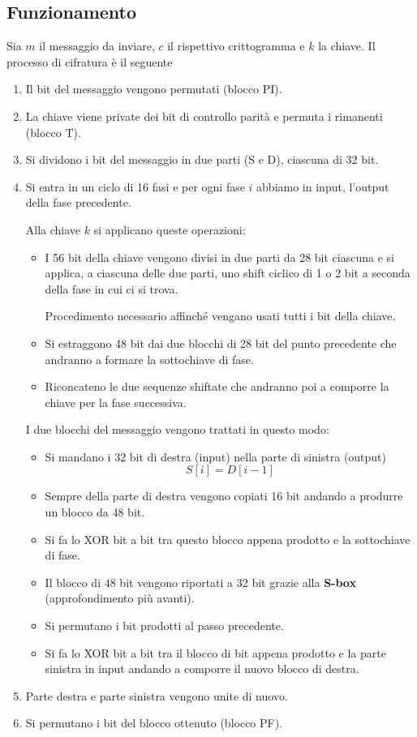 \subsection{Funzionamento}\label{funzionamento_DES}
Sia $m$ il messaggio da inviare, $c$ il rispettivo crittogramma e $k$ la chiave. Il processo di cifratura \`e il seguente
\begin{enumerate}
	\item Il bit del messaggio vengono permutati (blocco PI).
	\item La chiave viene private dei bit di controllo parit\`a e permuta i rimanenti (blocco T).
	\item Si dividono i bit del messaggio in due parti (S e D), ciascuna di 32 bit.
	\item Si entra in un ciclo di 16 fasi e per ogni fase $i$ abbiamo in input, l'output della fase precedente.

	      Alla chiave $k$ si applicano queste operazioni:
	      \begin{itemize}
		      \item I 56 bit della chiave vengono divisi in due parti da 28 bit ciascuna e si applica, a ciascuna delle
		            due parti, uno shift ciclico di 1 o 2 bit a seconda della fase in cui ci si trova.

		            Procedimento necessario affinch\'e vengano usati tutti i bit della chiave.
		      \item Si estraggono 48 bit dai due blocchi di 28 bit del punto precedente che andranno a formare la
		            sottochiave di fase.
		      \item Riconcateno le due sequenze shiftate che andranno poi a comporre la chiave per la fase successiva.
	      \end{itemize}
	      I due blocchi del messaggio vengono trattati in questo modo:
	      \begin{itemize}
		      \item Si mandano i 32 bit di destra (input) nella parte di sinistra (output)
		            \[ S[i] = D[i-1] \]
		      \item Sempre della parte di destra vengono copiati 16 bit andando a produrre un blocco da 48 bit.
		      \item Si fa lo XOR bit a bit tra questo blocco appena prodotto e la sottochiave di fase.
		      \item Il blocco di 48 bit vengono riportati a 32 bit grazie alla \textbf{S-box} (approfondimento pi\`u
		            avanti).
		      \item Si permutano i bit prodotti al passo precedente.
		      \item Si fa lo XOR bit a bit tra il blocco di bit appena prodotto e la parte sinistra in input andando a
		            comporre il nuovo blocco di destra.
	      \end{itemize}
	\item Parte destra e parte sinistra vengono unite di nuovo.
	\item Si permutano i bit del blocco ottenuto (blocco PF).
\end{enumerate}

